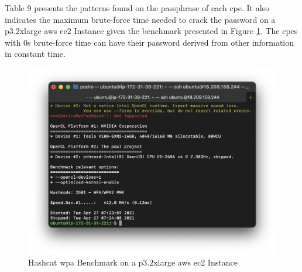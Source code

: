 Table 9 presents the patterns found on the passphrase of each \gls{cpe}. It also indicates the maximum brute-force time needed to crack the password on a p3.2xlarge \gls{aws} \gls{ec2} Instance \cite{aws_ec2_p3_instances} given the benchmark presented in Figure \ref{figure:hashcat_benchmark_wpa_pmk}. The \glspl{cpe} with 0s brute-force time can have their password derived from other information in constant time.

\begin{table}[h]
    \caption{Wireless Network Passphrase Pattern of the \gls{cpe}s}
    \label{table:cpes_wifi_pattern}
\end{table}

\begin{figure}[h]
    \centering
    \includegraphics[width=\linewidth]{contents/configuration-analysis/wifi/hashcat-benchmark-wpa-pmk.png}
    \caption{Hashcat \gls{wpa} Benchmark on a p3.2xlarge \gls{aws} \gls{ec2} Instance}
    \label{figure:hashcat_benchmark_wpa_pmk}
\end{figure}

